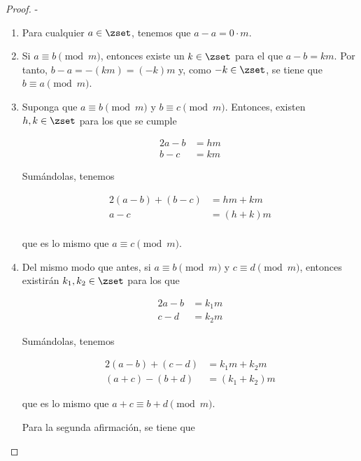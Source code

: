 \begin{proof}
  -

  \begin{enumerate}
    \item Para cualquier $a \in \zset$, tenemos que $a - a = 0\cdot m$.

    \item Si $a \equiv b \pmod m$, entonces existe un $k \in \zset$ para el
      que $a - b = km$. Por tanto, $b - a = {-(km)} = ({-k})m$ y, como ${-k}
      \in \zset$, se tiene que $b \equiv a \pmod m$.

    \item Suponga que $a \equiv b \pmod m$ y $b \equiv c \pmod m$. Entonces,
      existen $h, k \in \zset$ para los que se cumple

      \begin{alignat*}{2}
        a - b &= hm \\
        b - c &= km
      \end{alignat*}

      \noindent Sumándolas, tenemos

      \begin{alignat*}{2}
        (a - b) + (b - c)   &= hm + km \\
        a - c               &= (h + k)m \\
      \end{alignat*}

      \noindent que es lo mismo que $a \equiv c \pmod m$.

    \item Del mismo modo que antes, si $a \equiv b \pmod m$ y $c \equiv d
      \pmod m$, entonces existirán $k_1, k_2 \in \zset$ para los que

      \begin{alignat*}{2}
        a - b   &= k_1 m \\
        c - d   &= k_2 m
      \end{alignat*}

      \noindent Sumándolas, tenemos

      \begin{alignat*}{2}
        (a - b) + (c - d)   &= k_1 m + k_2 m \\
        (a + c) - (b + d)   &= (k_1 + k_2)m
      \end{alignat*}

      \noindent que es lo mismo que $a + c \equiv b + d \pmod m$.

      Para la segunda afirmación, se tiene que


\end{enumerate}
\end{proof}
